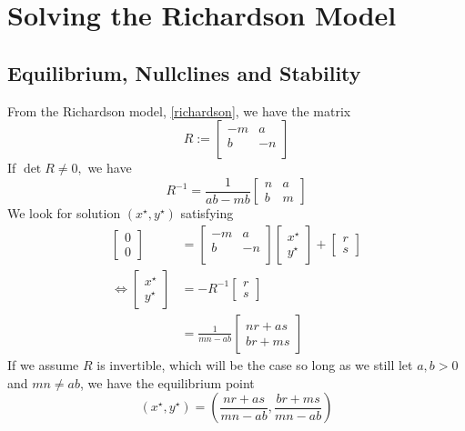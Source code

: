 \documentclass[12pt]{article}
\begin{document}
\section{Solving the Richardson Model}
\subsection{Equilibrium, Nullclines and Stability}
From the Richardson model, \autoref{richardson}, we have the matrix
\begin{equation*}
  R:=\begin{bmatrix}
    -m & a\\
    b & -n\\
  \end{bmatrix}
\end{equation*}
If $\det{R}\neq0,$ we have 
\[
  R^{-1}=\frac{1}{ab-mb}\begin{bmatrix}n & a\\ b & m\end{bmatrix}
\]We look for solution $(x^\star,y^\star)$ satisfying
\begin{align}\label{qstar}
  \begin{bmatrix}0 \\ 0\end{bmatrix}&=\begin{bmatrix}
    -m & a\\
    b & -n\\
    \end{bmatrix}\begin{bmatrix}x^\star\\y^\star\end{bmatrix}+\begin{bmatrix}r\\s\end{bmatrix} \\
    \iff \begin{bmatrix}x^\star \\ y^\star\end{bmatrix}&= -R^{-1}\begin{bmatrix}r\\s\end{bmatrix}\\
					   &=\frac{1}{mn-ab}\begin{bmatrix}nr+as \\ br+ms\end{bmatrix}
\end{align}
If we assume $R$ is invertible, which will be the case so long as we still let $a,b>0$ and $mn\neq ab$, we have the equilibrium point
\begin{equation*}
  \left(x^\star,y^\star\right)=\left(\frac{nr+as}{mn-ab},\frac{br+ms}{mn-ab}\right)
\end{equation*}
\end{document}
